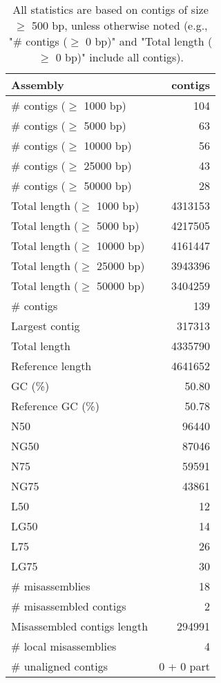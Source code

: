 \documentclass[12pt,a4paper]{article}
\begin{document}
\begin{table}[ht]
\begin{center}
\caption{All statistics are based on contigs of size $\geq$ 500 bp, unless otherwise noted (e.g., "\# contigs ($\geq$ 0 bp)" and "Total length ($\geq$ 0 bp)" include all contigs).}
\begin{tabular}{|l*{1}{|r}|}
\hline
Assembly & contigs \\ \hline
\# contigs ($\geq$ 1000 bp) & 104 \\ \hline
\# contigs ($\geq$ 5000 bp) & 63 \\ \hline
\# contigs ($\geq$ 10000 bp) & 56 \\ \hline
\# contigs ($\geq$ 25000 bp) & 43 \\ \hline
\# contigs ($\geq$ 50000 bp) & 28 \\ \hline
Total length ($\geq$ 1000 bp) & 4313153 \\ \hline
Total length ($\geq$ 5000 bp) & 4217505 \\ \hline
Total length ($\geq$ 10000 bp) & 4161447 \\ \hline
Total length ($\geq$ 25000 bp) & 3943396 \\ \hline
Total length ($\geq$ 50000 bp) & 3404259 \\ \hline
\# contigs & 139 \\ \hline
Largest contig & 317313 \\ \hline
Total length & 4335790 \\ \hline
Reference length & 4641652 \\ \hline
GC (\%) & 50.80 \\ \hline
Reference GC (\%) & 50.78 \\ \hline
N50 & 96440 \\ \hline
NG50 & 87046 \\ \hline
N75 & 59591 \\ \hline
NG75 & 43861 \\ \hline
L50 & 12 \\ \hline
LG50 & 14 \\ \hline
L75 & 26 \\ \hline
LG75 & 30 \\ \hline
\# misassemblies & 18 \\ \hline
\# misassembled contigs & 2 \\ \hline
Misassembled contigs length & 294991 \\ \hline
\# local misassemblies & 4 \\ \hline
\# unaligned contigs & 0 + 0 part \\ \hline

\end{tabular}
\end{center}
\end{table}
\end{document}
